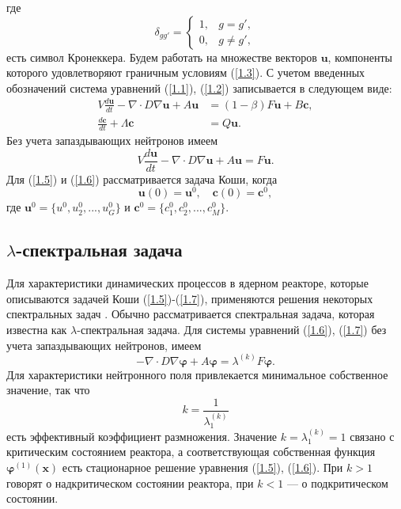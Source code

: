 \documentclass[a4paper,12pt]{article}
\begin{document}
где
\[
 \delta_{g g'} = \left \{ 
 \begin{matrix}
 1, & g = g', \\
 0, & g \neq  g',
 \end{matrix}
 \right. 
\] 
есть символ Кронеккера.
Будем работать на множестве векторов $\bm u$, компоненты которого удовлетворяют граничным условиям (\ref{1.3}).
С учетом введенных обозначений система уравнений (\ref{1.1}), (\ref{1.2}) записывается в следующем виде:
\begin{equation}\label{1.5}
\begin{split}
V \frac{d \bm{u}}{d t} -\nabla \cdot D \nabla \bm u  + A \bm{u} &=(1-\beta) F \bm{u} + B\bm c,
\\
\frac{d \bm c}{d t} + \Lambda \bm c &= Q \bm{u}. 
\end{split}
\end{equation}
Без учета запаздывающих нейтронов имеем
\begin{equation}\label{1.6}
V \frac{d \bm{u}}{d t} -\nabla \cdot D \nabla \bm{u}  + A \bm{u} = F \bm{u}.
\end{equation}  
Для (\ref{1.5}) и (\ref{1.6}) рассматривается задача Коши, когда
\begin{equation}\label{1.7}
 \bm u(0) = \bm u^0, \quad \bm c(0) = \bm c^0,
\end{equation} 
где $\bm u^0 = \{u^0,  u_2^0, ...,  u_G^0 \}$ и 
$\bm c^0 = \{ c_1^0,  c_2^0, ...,  c_M^0 \}$.

\subsection{$\lambda$-спектральная задача}
Для характеристики динамических процессов в ядерном реакторе, которые описываются задачей Коши (\ref{1.5})-(\ref{1.7}), применяются решения некоторых спектральных задач \cite{Bell1970,hetrick1971dynamics,stacey2007}.
Обычно рассматривается спектральная задача, которая известна как $\lambda$-спектральная задача.
Для системы уравнений (\ref{1.6}), (\ref{1.7}) без учета запаздывающих нейтронов, имеем
\begin{equation}\label{1.8}
-\nabla \cdot D \nabla \bm \varphi + A  \bm \varphi  = \lambda^{(k)} F \bm \varphi.
\end{equation}
Для характеристики нейтронного поля привлекается минимальное собственное значение, так что
\[
 k = \frac{1}{\lambda^{(k)}_1}  
\] 
есть эффективный коэффициент размножения.
Значение $k = \lambda^{(k)}_1 = 1$ связано с критическим состоянием реактора, а соответствующая собственная функция $\bm{\varphi}^{(1)}(\bm x)$ есть стационарное решение уравнения (\ref{1.5}), (\ref{1.6}).
При $k > 1$  говорят о надкритическом состоянии реактора, при $k < 1$  --- о подкритическом состоянии.
\end{document}
